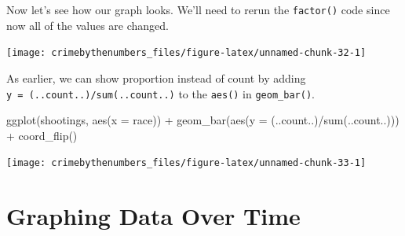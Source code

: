 \documentclass[
]{krantz}
\makeatletter
\newenvironment{Shaded}{\begin{snugshade}}{\end{snugshade}}
\newcommand{\AttributeTok}[1]{\textcolor[rgb]{0.61,0.61,0.61}{#1}}
\newcommand{\ConstantTok}[1]{\textcolor[rgb]{0,0,0}{#1}}
\newcommand{\FunctionTok}[1]{\textcolor[rgb]{0,0,0}{#1}}
\newcommand{\NormalTok}[1]{#1}
\newcommand{\OtherTok}[1]{\textcolor[rgb]{0.37,0.37,0.37}{#1}}
\newcommand{\SpecialCharTok}[1]{\textcolor[rgb]{0,0,0}{#1}}
\newenvironment{kframe}{%
\medskip{}
\setlength{\fboxsep}{.8em}
 \def\at@end@of@kframe{}%
 \ifinner\ifhmode%
  \def\at@end@of@kframe{\end{minipage}}%
  \begin{minipage}{\columnwidth}%
 \fi\fi%
 \def\FrameCommand##1{\hskip\@totalleftmargin \hskip-\fboxsep
 \colorbox{shadecolor}{##1}\hskip-\fboxsep
     \hskip-\linewidth \hskip-\@totalleftmargin \hskip\columnwidth}%
 \MakeFramed {\advance\hsize-\width
   \@totalleftmargin\z@ \linewidth\hsize
   \@setminipage}}%
 {\par\unskip\endMakeFramed%
 \at@end@of@kframe}
\renewenvironment{Shaded}{\begin{kframe}}{\end{kframe}}
\makeatother
\begin{document}
Now let's see how our graph looks. We'll need to rerun the \texttt{factor()} code since now all of the values are changed.

\begin{Shaded}
\end{Shaded}

\begin{center}\texttt{[image: crimebythenumbers\_files/figure-latex/unnamed-chunk-32-1]} \end{center}

As earlier, we can show proportion instead of count by adding \texttt{y\ =\ (..count..)/sum(..count..)} to the \texttt{aes()} in \texttt{geom\_bar()}.

\begin{Shaded}
\begin{Highlighting}[]
\FunctionTok{ggplot}\NormalTok{(shootings, }\FunctionTok{aes}\NormalTok{(}\AttributeTok{x =}\NormalTok{ race)) }\SpecialCharTok{+} 
  \FunctionTok{geom\_bar}\NormalTok{(}\FunctionTok{aes}\NormalTok{(}\AttributeTok{y =}\NormalTok{ (..count..)}\SpecialCharTok{/}\FunctionTok{sum}\NormalTok{(..count..))) }\SpecialCharTok{+}
  \FunctionTok{coord\_flip}\NormalTok{() }
\end{Highlighting}
\end{Shaded}

\begin{center}\texttt{[image: crimebythenumbers\_files/figure-latex/unnamed-chunk-33-1]} \end{center}

\hypertarget{graphing-data-over-time}{%
\section{Graphing Data Over Time}\label{graphing-data-over-time}}
\end{document}
